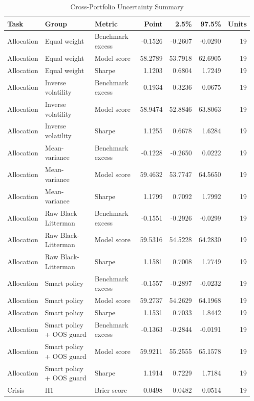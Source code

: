 \documentclass{ieeeaccess}
\begin{document}
\begin{table}[t]
\caption{Cross-Portfolio Uncertainty Summary}
\label{tab:uncertainty}
\centering
\scriptsize
\begin{tabularx}{\textwidth}{l Y Y r r r r}
\toprule
Task & Group & Metric & Point & 2.5\% & 97.5\% & Units \\
\midrule
Allocation & Equal weight & Benchmark excess & -0.1526 & -0.2607 & -0.0290 & 19 \\
Allocation & Equal weight & Model score & 58.2789 & 53.7918 & 62.6905 & 19 \\
Allocation & Equal weight & Sharpe & 1.1203 & 0.6804 & 1.7249 & 19 \\
Allocation & Inverse volatility & Benchmark excess & -0.1934 & -0.3236 & -0.0675 & 19 \\
Allocation & Inverse volatility & Model score & 58.9474 & 52.8846 & 63.8063 & 19 \\
Allocation & Inverse volatility & Sharpe & 1.1255 & 0.6678 & 1.6284 & 19 \\
Allocation & Mean-variance & Benchmark excess & -0.1228 & -0.2650 & 0.0222 & 19 \\
Allocation & Mean-variance & Model score & 59.4632 & 53.7747 & 64.5650 & 19 \\
Allocation & Mean-variance & Sharpe & 1.1799 & 0.7092 & 1.7992 & 19 \\
Allocation & Raw Black-Litterman & Benchmark excess & -0.1551 & -0.2926 & -0.0299 & 19 \\
Allocation & Raw Black-Litterman & Model score & 59.5316 & 54.5228 & 64.2830 & 19 \\
Allocation & Raw Black-Litterman & Sharpe & 1.1581 & 0.7008 & 1.7749 & 19 \\
Allocation & Smart policy & Benchmark excess & -0.1557 & -0.2897 & -0.0232 & 19 \\
Allocation & Smart policy & Model score & 59.2737 & 54.2629 & 64.1968 & 19 \\
Allocation & Smart policy & Sharpe & 1.1531 & 0.7033 & 1.8442 & 19 \\
Allocation & Smart policy + OOS guard & Benchmark excess & -0.1363 & -0.2844 & -0.0191 & 19 \\
Allocation & Smart policy + OOS guard & Model score & 59.9211 & 55.2555 & 65.1578 & 19 \\
Allocation & Smart policy + OOS guard & Sharpe & 1.1914 & 0.7229 & 1.7184 & 19 \\
Crisis & H1 & Brier score & 0.0498 & 0.0482 & 0.0514 & 19 \\

\end{tabularx}
\end{table}
\end{document}
